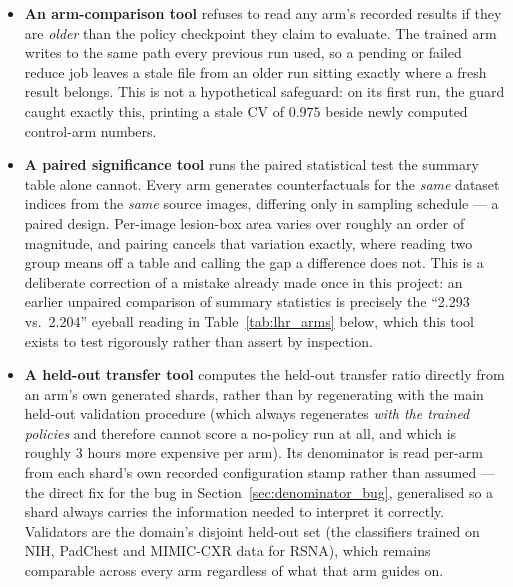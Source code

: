 \begin{itemize}[leftmargin=*]
  \item \textbf{An arm-comparison tool} refuses to read any arm's
        recorded results if they are \emph{older} than the policy
        checkpoint they claim to evaluate. The trained arm writes to the
        same path every previous run used, so a pending or failed reduce
        job leaves a stale file from an older run sitting exactly where a
        fresh result belongs. This is not a hypothetical safeguard: on
        its first run, the guard caught exactly this, printing a stale CV
        of $0.975$ beside newly computed control-arm numbers.
  \item \textbf{A paired significance tool} runs the paired statistical
        test the summary table alone cannot. Every arm generates
        counterfactuals for the \emph{same} dataset indices from the
        \emph{same} source images, differing only in sampling schedule ---
        a paired design. Per-image lesion-box area varies over roughly an
        order of magnitude, and pairing cancels that variation exactly,
        where reading two group means off a table and calling the gap a
        difference does not. This is a deliberate correction of a mistake
        already made once in this project: an earlier unpaired comparison
        of summary statistics is precisely the ``2.293 vs.\ 2.204''
        eyeball reading in Table~\ref{tab:lhr_arms} below, which this tool
        exists to test rigorously rather than assert by inspection.
  \item \textbf{A held-out transfer tool} computes the held-out transfer
        ratio directly from an arm's own generated shards, rather than by
        regenerating with the main held-out validation procedure (which
        always regenerates \emph{with the trained policies} and therefore
        cannot score a no-policy run at all, and which is roughly $3$
        hours more expensive per arm). Its denominator is read per-arm
        from each shard's own recorded configuration stamp rather than
        assumed --- the direct fix for the bug in
        Section~\ref{sec:denominator_bug}, generalised so a shard always
        carries the information needed to interpret it correctly.
        Validators are the domain's disjoint held-out set (the
        classifiers trained on NIH, PadChest and MIMIC-CXR data for
        RSNA), which remains comparable across every arm regardless of
        what that arm guides on.
\end{itemize}

